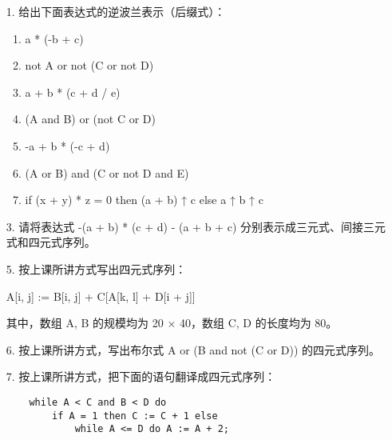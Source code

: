 \begin{enumerate}
    \item[1.] 给出下面表达式的逆波兰表示（后缀式）：
    
    \begin{enumerate}
        \item a * (-b + c)
        \item not A or not (C or not D)
        \item a + b * (c + d / e)
        \item (A and B) or (not C or D)
        \item -a + b * (-c + d)
        \item (A or B) and (C or not D and E)
        \item if (x + y) * z = 0 then (a + b) ↑ c else a ↑ b ↑ c
    \end{enumerate}
    
    \item[3.] 请将表达式 -(a + b) * (c + d) - (a + b + c) 分别表示成三元式、间接三元式和四元式序列。
    
    \item[5.] 按上课所讲方式写出四元式序列：
    
    \begin{center}
        A[i, j] := B[i, j] + C[A[k, l] + D[i + j]]
    \end{center}
    
    其中，数组 A, B 的规模均为 20 × 40，数组 C, D 的长度均为 80。
    
    \item[6.] 按上课所讲方式，写出布尔式 A or (B and not (C or D)) 的四元式序列。
    
    \item[7.] 按上课所讲方式，把下面的语句翻译成四元式序列：
    
    \begin{lstlisting}
    while A < C and B < D do
        if A = 1 then C := C + 1 else
            while A <= D do A := A + 2;
    \end{lstlisting}
\end{enumerate}